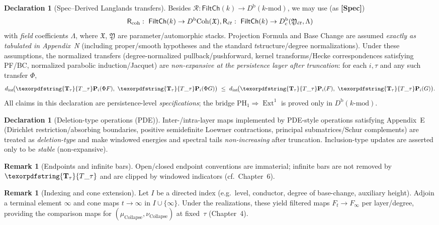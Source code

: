 \documentclass[11pt]{article}
\numberwithin{equation}{section}
\theoremstyle{plain}
\theoremstyle{definition}
\theoremstyle{remark}
\DeclareMathOperator{\Ext}{Ext}
\DeclareRobustCommand{\hyp}{\nobreakdash-}
\newcommand{\Rfun}{\mathcal{R}}
\theoremstyle{plain}
\theoremstyle{definition}
\numberwithin{equation}{section}
\theoremstyle{definition}
\newtheorem{remark}[theorem]{Remark}
\newtheorem{declaration}[theorem]{Declaration}
\DeclareRobustCommand{\FiltCh}[1]{\mathsf{FiltCh}(#1)}
\DeclareRobustCommand{\Ttau}{\texorpdfstring{\ensuremath{\mathbf{T}_{\tau}}}{T\_\tau}}
\numberwithin{equation}{section}
\theoremstyle{plain}
\theoremstyle{definition}
\theoremstyle{remark}
\providecommand{\Tfun}[1]{\mathbf{T}_{#1}}
\providecommand{\Ttau}{\Tfun{\tau}}
\providecommand{\n}{\unskip\space}
\begin{document}
\begin{declaration}[Spec–Derived Langlands transfers]\label{spec:9-derived}
Besides \(\Rfun:\FiltCh{k}\!\to\!D^{\mathrm{b}}(k\text{-mod})\), we may use (as \textbf{[Spec]})
\[
\mathsf{R}_{\mathrm{coh}}:\ \FiltCh{k}\to D^{\mathrm{b}}\!\operatorname{Coh}(\mathfrak{X}),\qquad\n\mathsf{R}_{\acute{e}t}:\ \FiltCh{k}\to D^{\mathrm{b}}_{\mathrm{c}}(\mathfrak{Y}_{\acute{e}t},\Lambda)
\]
with \emph{field} coefficients \(\Lambda\), where \(\mathfrak{X}\), \(\mathfrak{Y}\) are parameter/automorphic stacks.
Projection Formula and Base Change are assumed \emph{exactly as tabulated in Appendix~N} (including proper/smooth hypotheses and the standard \(t\)\nobreakdash structure/degree normalizations).
Under these assumptions, the normalized transfers (degree\hyp normalized pullback/pushforward, kernel transforms/Hecke correspondences satisfying PF/BC, normalized parabolic induction/Jacquet) are \emph{non\hyp expansive at the persistence layer after truncation}: for each \(i,\tau\) and any such transfer \(\Phi\),
\[
d_{\mathrm{int}}\!\big(\Ttau\mathbf{P}_i(\Phi F),\ \Ttau\mathbf{P}_i(\Phi G)\big)\ \le\ d_{\mathrm{int}}\!\big(\Ttau\mathbf{P}_i(F),\ \Ttau\mathbf{P}_i(G)\big).
\]
All claims in this declaration are persistence\hyp level \emph{specifications}; the bridge \(\mathrm{PH}_1\Rightarrow\Ext^1\) is proved only in \(D^{\mathrm{b}}(k\text{-mod})\).
\end{declaration}

\begin{declaration}[Deletion\hyp type operations (PDE)]\label{spec:9-pde}
Inter\hyp /intra\hyp layer maps implemented by PDE\hyp style operations satisfying Appendix~E
(Dirichlet restriction/absorbing boundaries, positive semidefinite Loewner contractions, principal submatrices/Schur complements)
are treated as \emph{deletion\hyp type} and make windowed energies and spectral tails \emph{non\hyp increasing} after truncation.
Inclusion\hyp type updates are asserted only to be \emph{stable} (non\hyp expansive).
\end{declaration}

\begin{remark}[Endpoints and infinite bars]\label{rk:9-endpoints}
Open/closed endpoint conventions are immaterial; infinite bars are not removed by \(\Ttau\) and are clipped by windowed indicators (cf.\ Chapter~6).
\end{remark}

\begin{remark}[Indexing and cone extension]\label{rk:9-cone}
Let \(I\) be a directed index (e.g.\ level, conductor, degree of base\hyp change, auxiliary height).
Adjoin a terminal element \(\infty\) and cone maps \(t\to \infty\) in \(I\cup\{\infty\}\).
Under the realizations, these yield filtered maps \(F_t\to F_\infty\) per layer/degree, providing the comparison maps for \((\mu_{\mathrm{Collapse}},\nu_{\mathrm{Collapse}})\) at fixed~\(\tau\) (Chapter~4).
\end{remark}
\end{document}
